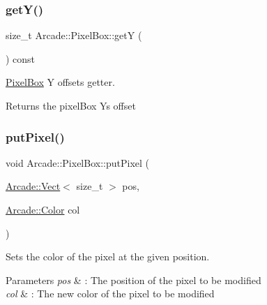 \subsubsection{\texorpdfstring{get\+Y()}{getY()}}
{\footnotesize\ttfamily size\+\_\+t Arcade\+::\+Pixel\+Box\+::getY (\begin{DoxyParamCaption}{ }\end{DoxyParamCaption}) const}



\hyperlink{class_arcade_1_1_pixel_box}{Pixel\+Box} Y offset\textquotesingle{}s getter. 

\begin{DoxyReturn}{Returns}
the pixel\+Box Y\textquotesingle{}s offset 
\end{DoxyReturn}
\mbox{\label{class_arcade_1_1_pixel_box_a517214a6fd2fc9007aabe0f4a013ca0c}} 
\subsubsection{\texorpdfstring{put\+Pixel()}{putPixel()}}
{\footnotesize\ttfamily void Arcade\+::\+Pixel\+Box\+::put\+Pixel (\begin{DoxyParamCaption}\item[{\hyperlink{class_arcade_1_1_vect}{Arcade\+::\+Vect}$<$ size\+\_\+t $>$}]{pos,  }\item[{\hyperlink{class_arcade_1_1_color}{Arcade\+::\+Color}}]{col }\end{DoxyParamCaption})}



Sets the color of the pixel at the given position. 


\begin{DoxyParams}{Parameters}
{\em pos} & \+: The position of the pixel to be modified \\
\hline
{\em col} & \+: The new color of the pixel to be modified \\
\hline
\end{DoxyParams}
\mbox{\label{class_arcade_1_1_pixel_box_ac93dc2a0d6f36f11bf798aafac8968f0}} 
